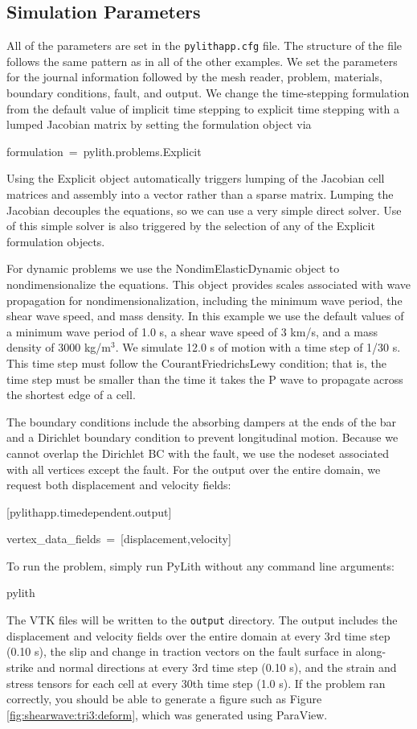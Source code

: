 \subsection{Simulation Parameters}

All of the parameters are set in the \texttt{pylithapp.cfg} file.
The structure of the file follows the same pattern as in all of the
other examples. We set the parameters for the journal information
followed by the mesh reader, problem, materials, boundary conditions,
fault, and output. We change the time-stepping formulation from the
default value of implicit time stepping to explicit time stepping
with a lumped Jacobian matrix by setting the formulation object via
\begin{lyxcode}
formulation~=~pylith.problems.Explicit
\end{lyxcode}
Using the Explicit object automatically triggers lumping of the Jacobian
cell matrices and assembly into a vector rather than a sparse matrix.
Lumping the Jacobian decouples the equations, so we can use a very
simple direct solver. Use of this simple solver is also triggered
by the selection of any of the Explicit formulation objects. 

For dynamic problems we use the NondimElasticDynamic object to nondimensionalize
the equations. This object provides scales associated with wave propagation
for nondimensionalization, including the minimum wave period, the
shear wave speed, and mass density. In this example we use the default
values of a minimum wave period of 1.0 s, a shear wave speed of 3
km/s, and a mass density of 3000 kg/m$^{3}$. We simulate 12.0 s of
motion with a time step of 1/30 s. This time step must follow the
Courant\textendash{}Friedrichs\textendash{}Lewy condition; that is,
the time step must be smaller than the time it takes the P wave to
propagate across the shortest edge of a cell. 

The boundary conditions include the absorbing dampers at the ends
of the bar and a Dirichlet boundary condition to prevent longitudinal
motion. Because we cannot overlap the Dirichlet BC with the fault,
we use the nodeset associated with all vertices except the fault.
For the output over the entire domain, we request both displacement
and velocity fields:
\begin{lyxcode}
{[}pylithapp.timedependent.output{]}

vertex\_data\_fields~=~{[}displacement,velocity{]}
\end{lyxcode}
To run the problem, simply run PyLith without any command line arguments:
\begin{lyxcode}
pylith
\end{lyxcode}
The VTK files will be written to the \texttt{output} directory. The
output includes the displacement and velocity fields over the entire
domain at every 3rd time step (0.10 s), the slip and change in traction
vectors on the fault surface in along-strike and normal directions
at every 3rd time step (0.10 s), and the strain and stress tensors
for each cell at every 30th time step (1.0 s). If the problem ran
correctly, you should be able to generate a figure such as Figure
\vref{fig:shearwave:tri3:deform}, which was generated using ParaView.

